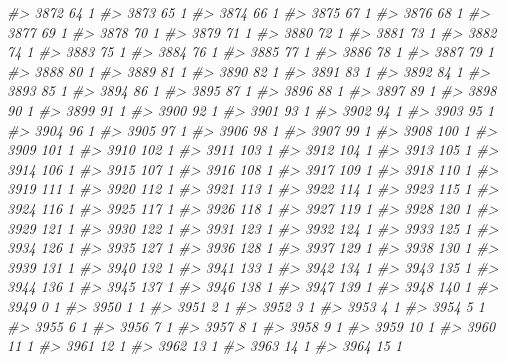 \documentclass[]{article}
\newenvironment{Shaded}{\begin{snugshade}}{\end{snugshade}}
\newcommand{\CommentTok}[1]{\textcolor[rgb]{0.56,0.35,0.01}{\textit{#1}}}
\begin{document}
\begin{Shaded}
\begin{Highlighting}[]
\CommentTok{#> 3872  64  1}
\CommentTok{#> 3873  65  1}
\CommentTok{#> 3874  66  1}
\CommentTok{#> 3875  67  1}
\CommentTok{#> 3876  68  1}
\CommentTok{#> 3877  69  1}
\CommentTok{#> 3878  70  1}
\CommentTok{#> 3879  71  1}
\CommentTok{#> 3880  72  1}
\CommentTok{#> 3881  73  1}
\CommentTok{#> 3882  74  1}
\CommentTok{#> 3883  75  1}
\CommentTok{#> 3884  76  1}
\CommentTok{#> 3885  77  1}
\CommentTok{#> 3886  78  1}
\CommentTok{#> 3887  79  1}
\CommentTok{#> 3888  80  1}
\CommentTok{#> 3889  81  1}
\CommentTok{#> 3890  82  1}
\CommentTok{#> 3891  83  1}
\CommentTok{#> 3892  84  1}
\CommentTok{#> 3893  85  1}
\CommentTok{#> 3894  86  1}
\CommentTok{#> 3895  87  1}
\CommentTok{#> 3896  88  1}
\CommentTok{#> 3897  89  1}
\CommentTok{#> 3898  90  1}
\CommentTok{#> 3899  91  1}
\CommentTok{#> 3900  92  1}
\CommentTok{#> 3901  93  1}
\CommentTok{#> 3902  94  1}
\CommentTok{#> 3903  95  1}
\CommentTok{#> 3904  96  1}
\CommentTok{#> 3905  97  1}
\CommentTok{#> 3906  98  1}
\CommentTok{#> 3907  99  1}
\CommentTok{#> 3908 100  1}
\CommentTok{#> 3909 101  1}
\CommentTok{#> 3910 102  1}
\CommentTok{#> 3911 103  1}
\CommentTok{#> 3912 104  1}
\CommentTok{#> 3913 105  1}
\CommentTok{#> 3914 106  1}
\CommentTok{#> 3915 107  1}
\CommentTok{#> 3916 108  1}
\CommentTok{#> 3917 109  1}
\CommentTok{#> 3918 110  1}
\CommentTok{#> 3919 111  1}
\CommentTok{#> 3920 112  1}
\CommentTok{#> 3921 113  1}
\CommentTok{#> 3922 114  1}
\CommentTok{#> 3923 115  1}
\CommentTok{#> 3924 116  1}
\CommentTok{#> 3925 117  1}
\CommentTok{#> 3926 118  1}
\CommentTok{#> 3927 119  1}
\CommentTok{#> 3928 120  1}
\CommentTok{#> 3929 121  1}
\CommentTok{#> 3930 122  1}
\CommentTok{#> 3931 123  1}
\CommentTok{#> 3932 124  1}
\CommentTok{#> 3933 125  1}
\CommentTok{#> 3934 126  1}
\CommentTok{#> 3935 127  1}
\CommentTok{#> 3936 128  1}
\CommentTok{#> 3937 129  1}
\CommentTok{#> 3938 130  1}
\CommentTok{#> 3939 131  1}
\CommentTok{#> 3940 132  1}
\CommentTok{#> 3941 133  1}
\CommentTok{#> 3942 134  1}
\CommentTok{#> 3943 135  1}
\CommentTok{#> 3944 136  1}
\CommentTok{#> 3945 137  1}
\CommentTok{#> 3946 138  1}
\CommentTok{#> 3947 139  1}
\CommentTok{#> 3948 140  1}
\CommentTok{#> 3949   0  1}
\CommentTok{#> 3950   1  1}
\CommentTok{#> 3951   2  1}
\CommentTok{#> 3952   3  1}
\CommentTok{#> 3953   4  1}
\CommentTok{#> 3954   5  1}
\CommentTok{#> 3955   6  1}
\CommentTok{#> 3956   7  1}
\CommentTok{#> 3957   8  1}
\CommentTok{#> 3958   9  1}
\CommentTok{#> 3959  10  1}
\CommentTok{#> 3960  11  1}
\CommentTok{#> 3961  12  1}
\CommentTok{#> 3962  13  1}
\CommentTok{#> 3963  14  1}
\CommentTok{#> 3964  15  1}

\end{Highlighting}
\end{Shaded}
\end{document}
